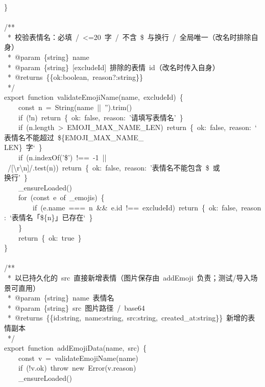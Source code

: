 \documentclass[a4paper,10pt]{article}
\begin{document}
{\ttfamily\footnotesize\raggedright
\}\\
\mbox{}\\
/**\\
~*~校验表情名：必填~/~<=20~字~/~不含~\$~与换行~/~全局唯一（改名时排除自身）\\
~*~@param~\{string\}~name\\
~*~@param~\{string\}~[excludeId]~排除的表情~id（改名时传入自身）\\
~*~@returns~\{\{ok:boolean,~reason?:string\}\}\\
~*/\\
export~function~validateEmojiName(name,~excludeId)~\{\\
~~~~const~n~=~String(name~||~'').trim()\\
~~~~if~(!n)~return~\{~ok:~false,~reason:~'请填写表情名'~\}\\
~~~~if~(n.length~>~EMOJI\_MAX\_NAME\_LEN)~return~\{~ok:~false,~reason:~`表情名不能超过~\$\{EMOJI\_MAX\_NAME\_\\
LEN\}~字`~\}\\
~~~~if~(n.indexOf('\$')~!==~-1~||~/[\textbackslash{}r\textbackslash{}n]/.test(n))~return~\{~ok:~false,~reason:~'表情名不能包含~\$~或\\
换行'~\}\\
~~~~\_ensureLoaded()\\
~~~~for~(const~e~of~\_emojis)~\{\\
~~~~~~~~if~(e.name~===~n~\&\&~e.id~!==~excludeId)~return~\{~ok:~false,~reason:~`表情名「\$\{n\}」已存在`~\}\\
~~~~\}\\
~~~~return~\{~ok:~true~\}\\
\}\\
\mbox{}\\
/**\\
~*~以已持久化的~src~直接新增表情（图片保存由~addEmoji~负责；测试/导入场景可直用）\\
~*~@param~\{string\}~name~表情名\\
~*~@param~\{string\}~src~图片路径~/~base64\\
~*~@returns~\{\{id:string,~name:string,~src:string,~created\_at:string\}\}~新增的表情副本\\
~*/\\
export~function~addEmojiData(name,~src)~\{\\
~~~~const~v~=~validateEmojiName(name)\\
~~~~if~(!v.ok)~throw~new~Error(v.reason)\\
~~~~\_ensureLoaded()\\
}
\end{document}
